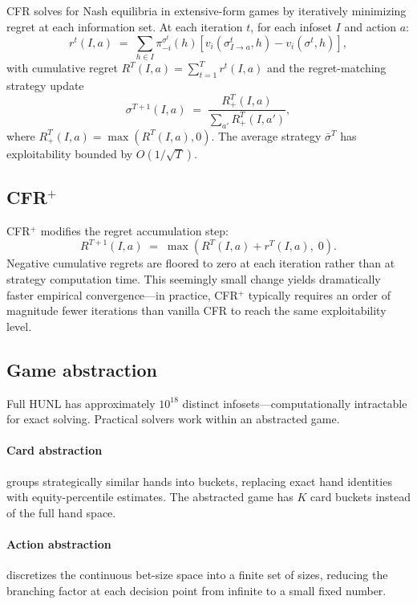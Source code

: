 CFR \citep{zinkevich2007} solves for Nash equilibria in extensive-form games
by iteratively minimizing regret at each information set. At each iteration
$t$, for each infoset $I$ and action $a$:
\[
  r^t(I, a)
    \;=\; \sum_{h \in I} \pi_{-i}^{\sigma^t}(h)
          \left[v_i(\sigma^t_{I \to a}, h) - v_i(\sigma^t, h)\right],
\]
with cumulative regret $R^T(I, a) = \sum_{t=1}^T r^t(I, a)$ and the
regret-matching strategy update
\[
  \sigma^{T+1}(I, a)
    \;=\; \frac{R^T_+(I, a)}{\sum_{a'} R^T_+(I, a')},
\]
where $R^T_+(I, a) = \max(R^T(I, a), 0)$. The average strategy
$\bar{\sigma}^T$ has exploitability bounded by $O(1/\sqrt{T})$.

\subsection{CFR$^+$}

CFR$^+$ \citep{tammelin2014} modifies the regret accumulation step:
\[
  R^{T+1}(I, a)
    \;=\; \max\!\left(R^T(I, a) + r^T(I, a), \; 0\right).
\]
Negative cumulative regrets are floored to zero at each iteration rather
than at strategy computation time. This seemingly small change yields
dramatically faster empirical convergence---in practice, CFR$^+$ typically
requires an order of magnitude fewer iterations than vanilla CFR to reach
the same exploitability level.

\subsection{Game abstraction}

Full HUNL has approximately $10^{18}$ distinct infosets---computationally
intractable for exact solving. Practical solvers work within an abstracted
game.

\paragraph{Card abstraction} groups strategically similar hands into buckets,
replacing exact hand identities with equity-percentile estimates. The
abstracted game has $K$ card buckets instead of the full hand space.

\paragraph{Action abstraction} discretizes the continuous bet-size space
into a finite set of sizes, reducing the branching factor at each decision
point from infinite to a small fixed number.
